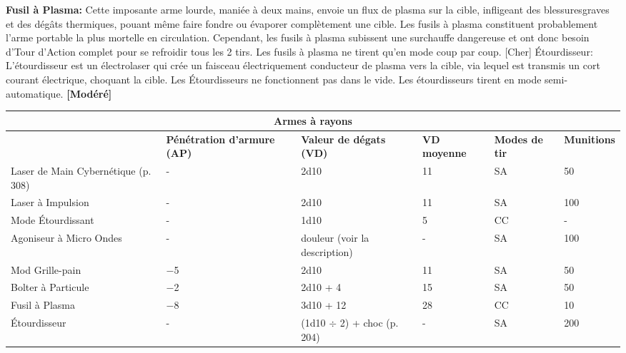 \textbf{Fusil à Plasma:} Cette imposante arme lourde, maniée à deux mains, envoie un flux de plasma sur la cible, infligeant des blessuresgraves et des dégâts thermiques, pouant même faire fondre ou évaporer complètement une cible. Les fusils à plasma constituent probablement l'arme portable la plus mortelle en circulation. Cependant, les fusils à plasma subissent une surchauffe dangereuse et ont donc besoin d'Tour d'Action complet pour se refroidir tous les 2 tirs. Les fusils à plasma ne tirent qu'en mode coup par coup. [Cher] Étourdisseur: L'étourdisseur est un électrolaser qui crée un faisceau électriquement conducteur de plasma vers la cible, via lequel est transmis un cort courant électrique, choquant la cible. Les Étourdisseurs ne fonctionnent pas dans le vide. Les étourdisseurs tirent en mode semi-automatique. \textbf{[Modéré]} 

\begin{table} \begin{tabularx}{\textwidth}{|X|X|X|X|l|l|} \hline

\multicolumn{6}{|c|}{\textbf{Armes à rayons}} \\ \hline

&\textbf{Pénétration d'armure (AP)}	&\textbf{Valeur de dégats (VD)}	&\textbf{VD moyenne}	&\textbf{Modes de tir}	&\textbf{Munitions} \\ \hline

Laser de Main Cybernétique (p. 308)	&- &2d10	&11	&SA	&50 \\ \hline

Laser à Impulsion	&- &2d10	&11	&SA	&100 \\ \hline

Mode Étourdissant	&- &1d10	&5	&CC	&- \\ \hline

Agoniseur à Micro Ondes	&- &douleur (voir la description)	&- &SA	&100 \\ \hline

Mod Grille-pain	&$-$5	&2d10	&11	&SA	&50 \\ \hline

Bolter à Particule	&$-$2	&2d10 + 4	&15	&SA	&50 \\ \hline

Fusil à Plasma	&$-$8	&3d10 + 12	&28	&CC	&10 \\ \hline

Étourdisseur	&- &(1d10 $\div$ 2) + choc (p. 204)	&- &SA	&200 \\ \hline

\end{tabularx} \label{tab:beam-weapons} \end{table} 

